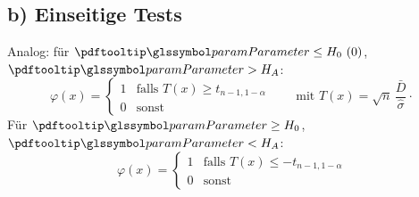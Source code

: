 \subsection*{b) Einseitige Tests}

Analog: für $\param \leq H_0\ (0)$, $\param > H_A$:
\[
    \varphi(x) = \begin{cases} 1 & \text{falls } T(x) \geq t_{n-1,1-\alpha} \\ 0 & \text{sonst} \end{cases}
    \qquad \text{mit } T(x) = \sqrt n\, \frac{\bar D}{\widehat\sigma} \cdot
\]
Für $\param \geq H_0$, $\param < H_A$:
\[
    \varphi(x) = \begin{cases} 1 & \text{falls } T(x) \leq -t_{n-1,1-\alpha} \\ 0 & \text{sonst} \end{cases}
\]


